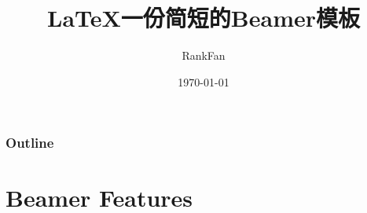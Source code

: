 \documentclass[UTF8, aspectratio=169 , 10pt，punct=kaiming]{beamer} %
\title[Beamer]{ \LaTeX 一份简短的Beamer模板  }
\author[RankFan] {\small{ RankFan \inst{1}}} %
\institute[X~M~U]{XMU WISER}
\date{\today}
\begin{document}
\frame[plain]{\titlepage}

\begin{frame}[plain]
  \frametitle{Outline}
  \tableofcontents[hideallsubsections]
\end{frame}



\section{Beamer Features}
\end{document}
